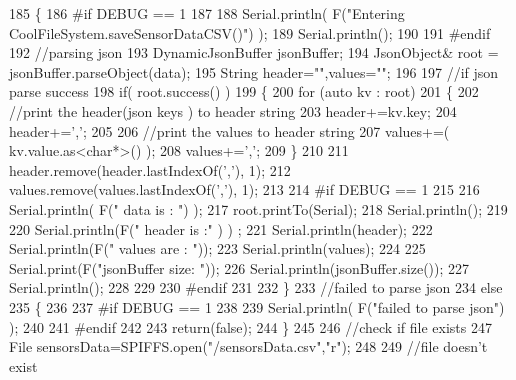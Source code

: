 \begin{DoxyCode}
185 \{
186 \textcolor{preprocessor}{#if DEBUG == 1}
187 
188     Serial.println( F(\textcolor{stringliteral}{"Entering CoolFileSystem.saveSensorDataCSV()"}) );
189     Serial.println();
190 
191 \textcolor{preprocessor}{#endif}
192     \textcolor{comment}{//parsing json}
193     DynamicJsonBuffer jsonBuffer;
194     JsonObject& root = jsonBuffer.parseObject(data);
195     String header=\textcolor{stringliteral}{""},values=\textcolor{stringliteral}{""};
196     
197     \textcolor{comment}{//if json parse success}
198     \textcolor{keywordflow}{if}( root.success() )
199     \{       
200         \textcolor{keywordflow}{for} (\textcolor{keyword}{auto} kv : root) 
201         \{
202             \textcolor{comment}{//print the header(json keys ) to header string}
203             header+=kv.key;
204             header+=\textcolor{charliteral}{','};
205             
206             \textcolor{comment}{//print the values to header string}
207             values+=( kv.value.as<\textcolor{keywordtype}{char}*>() );
208             values+=\textcolor{charliteral}{','};
209         \}
210 
211         header.remove(header.lastIndexOf(\textcolor{charliteral}{','}), 1);
212         values.remove(values.lastIndexOf(\textcolor{charliteral}{','}), 1);      
213     
214 \textcolor{preprocessor}{    #if DEBUG == 1}
215     
216         Serial.println( F(\textcolor{stringliteral}{" data is : "}) );
217         root.printTo(Serial);
218         Serial.println();
219         
220         Serial.println(F(\textcolor{stringliteral}{" header is :"} ) ) ;
221         Serial.println(header);
222         Serial.println(F(\textcolor{stringliteral}{" values are : "}));
223         Serial.println(values);
224         
225         Serial.print(F(\textcolor{stringliteral}{"jsonBuffer size: "}));
226         Serial.println(jsonBuffer.size());
227         Serial.println();
228 
229     
230 \textcolor{preprocessor}{    #endif}
231     
232     \}
233     \textcolor{comment}{//failed to parse json}
234     \textcolor{keywordflow}{else}
235     \{
236     
237 \textcolor{preprocessor}{    #if DEBUG == 1}
238 
239         Serial.println( F(\textcolor{stringliteral}{"failed to parse json"}) );
240     
241 \textcolor{preprocessor}{    #endif}
242 
243         \textcolor{keywordflow}{return}(\textcolor{keyword}{false});
244     \}
245 
246     \textcolor{comment}{//check if file exists}
247     File sensorsData=SPIFFS.open(\textcolor{stringliteral}{"/sensorsData.csv"},\textcolor{stringliteral}{"r"});
248     
249     \textcolor{comment}{//file doesn't exist}

\end{DoxyCode}
